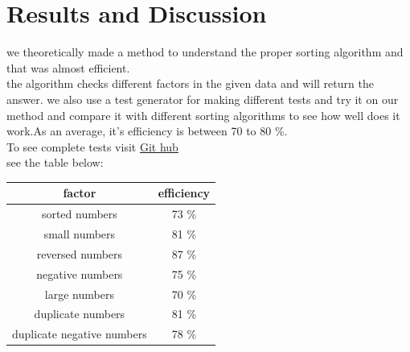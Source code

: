 \documentclass[
10pt, %
a4paper, %
oneside, %
headinclude,footinclude, %
BCOR5mm, %
]{scrartcl}
\begin{document}
\newpage

\begin{center}

\end{center}




\section{Results and Discussion}


we theoretically made a method to understand the proper sorting  algorithm and that was almost efficient.\\
the algorithm checks different factors in the given data and will return the answer. we also use a test generator for making different tests and try it on our method and compare it with different sorting algorithms to see how well does it work.As an average, it's efficiency is between 70 to 80 \%.
\\
To see complete tests visit \href{https://github.com/prhdm/Best-sorting-algorithm}{Git hub}
\\
see the table below:
\\

\begin{table}[ht]
\centering
\begin{tabular}{|c|c|}
\hline
 factor & efficiency\\
 \hline
 \hline
 sorted numbers & 73 \% \\
 \hline
 small numbers & 81 \% \\
 \hline
 reversed numbers & 87 \% \\
 \hline
 negative numbers & 75 \% \\
 \hline
 large numbers & 70 \% \\
 \hline
 duplicate numbers & 81 \% \\
 \hline 
 duplicate negative numbers & 78 \% \\
 \hline
 

\end{tabular}
\end{table}
\end{document}

